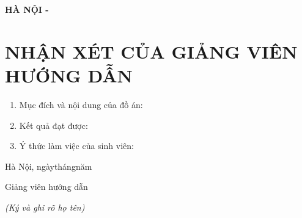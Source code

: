 \documentclass[12pt,a4paper,oneside]{book}
\begin{document}
\begin{titlepage}
\begin{center}
\begin{large}
\begin{flushleft}
			\end{flushleft}
		\end{large}
		\vfill
		\begin{large}\bfseries
			HÀ NỘI - \the\year\par
		\end{large}
	\end{center}
\end{titlepage}

\frontmatter

\chapter*{\centering\LARGE\MakeUppercase{Nhận xét của giảng viên hướng dẫn}}
\begin{enumerate}
	\item Mục đích và nội dung của đồ án:\par
	\dotfill\par\dotfill\par\dotfill\par\dotfill\par\dotfill
	\item Kết quả đạt được:\par
	\dotfill\par\dotfill\par\dotfill\par\dotfill\par\dotfill
	\item Ý thức làm việc của sinh viên:\par
	\dotfill\par\dotfill\par\dotfill\par\dotfill\par\dotfill
\end{enumerate}
\hfill
\begin{minipage}[t]{0.48\textwidth}
	\begin{center}
		Hà Nội, ngày\hspace{5mm}tháng\hspace{5mm}năm\par
		Giảng viên hướng dẫn\par
		\textit{(Ký và ghi rõ họ tên)}
	\end{center}
\end{minipage}
\end{document}

